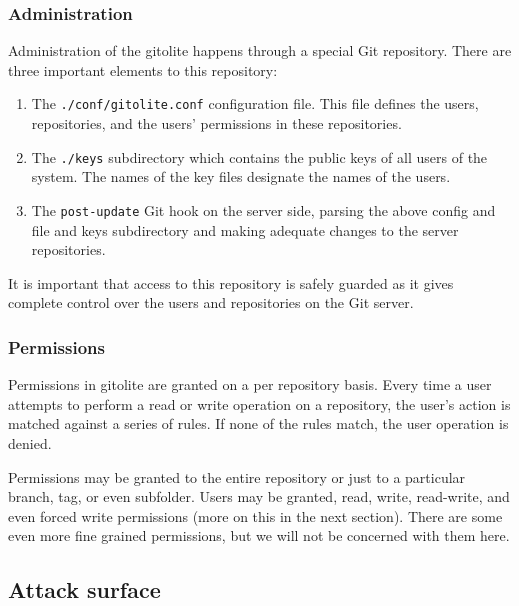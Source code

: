 \subsubsection{Administration}

Administration of the gitolite happens through a special Git repository. There
are three important elements to this repository:

\begin{enumerate}

\item The \texttt{./conf/gitolite.conf} configuration file. This file defines
the users, repositories, and the users' permissions in these repositories.

\item The \texttt{./keys} subdirectory which contains the public keys of all
users of the system. The names of the key files designate the names of the
users\cite{gitolite-com-2014d}.

\item The \texttt{post-update} Git hook on the server side, parsing the above
config and file and keys subdirectory and making adequate changes to the
server repositories.

\end{enumerate}

It is important that access to this repository is safely guarded as it gives
complete control over the users and repositories on the Git server.

\subsubsection{Permissions}

Permissions in gitolite are granted on a per repository basis. Every time a
user attempts to perform a read or write operation on a repository, the user's
action is matched against a series of rules. If none of the rules match, the
user operation is denied.

Permissions may be granted to the entire repository or just to a particular
branch, tag, or even subfolder. Users may be granted, read, write, read-write,
and even forced write permissions (more on this in the next section).  There
are some even more fine grained permissions\cite{gitolite-com-2014e}, but we
will not be concerned with them here.

\subsection{Attack surface}

